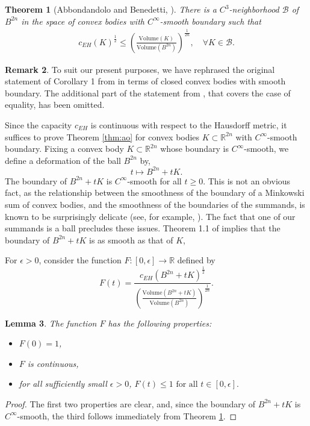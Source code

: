 \documentclass[12pt]{amsart}
\newtheorem{theorem}{Theorem}[section]
\newtheorem{lemma}[theorem]{Lemma}
\theoremstyle{definition}
\newtheorem{remark}[theorem]{Remark}
\newcommand{\RR}{{\mathbb R}}
\newcommand{\V}{{\mathrm {Volume}}}
\begin{document}
\begin{theorem}[Abbondandolo and Benedetti, \cite{ab}]\label{thm:ab}
  There is a $C^3$-neighborhood $\mathcal{B}$ of $B^{2n}$ in the space of convex bodies with $C^{\infty}$-smooth boundary such that 
  \begin{align*}
       c_{EH}(K)^{\frac{1}{2}} \leq \left(\frac{\V(K)}{\V(B^{2n})}\right)^{\frac{1}{2n}},\quad \forall K \in \mathcal{B}.
  \end{align*}
\end{theorem}

\begin{remark}
To suit our present purposes, we have rephrased the original statement of Corollary 1 from \cite{ab} in terms of closed convex bodies with smooth boundary. The additional part of the statement from \cite{ab}, that covers the case of equality, has been omitted.
\end{remark}

Since the capacity $c_{EH}$ is continuous with respect to the Hausdorff metric, it suffices to prove Theorem \ref{thm:ao} for convex bodies $K \subset \RR^{2n}$ with $C^{\infty}$-smooth boundary. Fixing a convex body $K \subset \RR^{2n}$ whose boundary is $C^{\infty}$-smooth, we define a deformation of the ball $B^{2n}$ by, $$t \mapsto B^{2n} + tK.$$ The boundary of $B^{2n} + tK$ is $C^{\infty}$-smooth for all $t\geq 0.$ This is not an obvious fact, as the relationship between the smoothness of the boundary of a Minkowski sum of convex bodies, and the smoothness of the boundaries of the summands, is known to be surprisingly delicate (see, for example, \cite{kis}). The fact that one of our summands is a ball precludes these issues. Theorem 1.1 of \cite{bj} implies that the boundary of $B^{2n} + tK$ is as smooth as that of $K$,


For $\epsilon>0$, consider the function $F \colon [0,\epsilon] \to \RR$ defined by
\begin{equation*} F(t) = \frac{c_{EH}(B^{2n} + tK)^{\frac{1}{2}}}{\left(\frac{\V(B^{2n} + tK)}{\V(B^{2n})}\right)^{\frac{1}{2n}}}.\end{equation*} 
\begin{lemma}\label{F} The function $F$ has the following properties:
\begin{itemize}
    \item[(F1)] $F(0)=1$,
    \item[(F2)] $F$ is continuous,
    \item[(F3)] for all sufficiently small $\epsilon > 0$,  $F(t) \leq 1 \text{  for all  } t \in [0,\epsilon].$   
\end{itemize}
\end{lemma}
\begin{proof}
    The first two properties are clear, and, since the boundary of $B^{2n} + tK$ is $C^{\infty}$-smooth, the third follows immediately from Theorem \ref{thm:ab}.
\end{proof}
\end{document}
